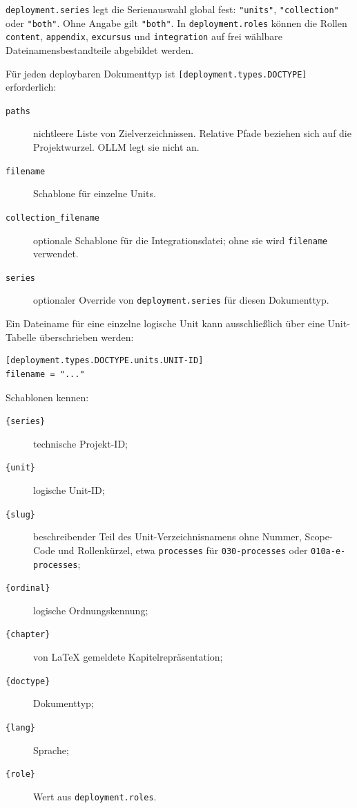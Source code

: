 \documentclass[
load-preamble+
]{osgdoc}
\begin{document}
\verb|deployment.series| legt die Serienauswahl global fest:
\verb|"units"|, \verb|"collection"| oder \verb|"both"|. Ohne Angabe
gilt \verb|"both"|. In \verb|deployment.roles| können die Rollen
\texttt{content}, \texttt{appendix}, \texttt{excursus} und
\texttt{integration} auf frei wählbare Dateinamensbestandteile abgebildet
werden.

Für jeden deploybaren Dokumenttyp ist
\verb|[deployment.types.DOCTYPE]| erforderlich:

\begin{description}
\item[\texttt{paths}] nichtleere Liste von Zielverzeichnissen. Relative Pfade
  beziehen sich auf die Projektwurzel. OLLM legt sie nicht an.
\item[\texttt{filename}] Schablone für einzelne Units.
\item[\texttt{collection\_filename}] optionale Schablone für die
  Integrationsdatei; ohne sie wird \texttt{filename} verwendet.
\item[\texttt{series}] optionaler Override von
  \verb|deployment.series| für diesen Dokumenttyp.
\end{description}

Ein Dateiname für eine einzelne logische Unit kann ausschließlich über eine
Unit-Tabelle überschrieben werden:

\begin{verbatim}
[deployment.types.DOCTYPE.units.UNIT-ID]
filename = "..."
\end{verbatim}

Schablonen kennen:

\begin{description}
\item[\texttt{\{series\}}] technische Projekt-ID;
\item[\texttt{\{unit\}}] logische Unit-ID;
\item[\texttt{\{slug\}}] beschreibender Teil des Unit-Verzeichnisnamens
  ohne Nummer, Scope-Code und Rollenkürzel, etwa \texttt{processes} für
  \texttt{030-processes} oder \texttt{010a-e-processes};
\item[\texttt{\{ordinal\}}] logische Ordnungskennung;
\item[\texttt{\{chapter\}}] von LaTeX gemeldete Kapitelrepräsentation;
\item[\texttt{\{doctype\}}] Dokumenttyp;
\item[\texttt{\{lang\}}] Sprache;
\item[\texttt{\{role\}}] Wert aus \verb|deployment.roles|.
\end{description}
\end{document}
